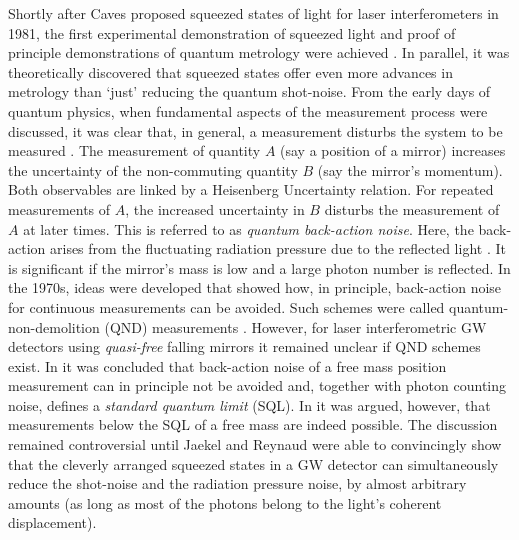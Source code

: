 Shortly after Caves proposed squeezed states of light for laser
interferometers in 1981, the first experimental demonstration of squeezed
light \cite{Slusher1985} and proof of principle demonstrations of
quantum metrology were achieved \cite{Xiao1987,Grangier1987}. In parallel, it was theoretically discovered that squeezed states offer even more advances in metrology than `just' reducing the quantum shot-noise.
From the early days of quantum physics, when fundamental
aspects of the measurement process were discussed, it was clear that,
in general, a measurement disturbs the system to be measured
\cite{Braginsky1999}. %
 The measurement of quantity $A$ (say
a position of a mirror) increases the uncertainty of the
non-commuting quantity $B$ (say the mirror's momentum). Both
observables are linked by a Heisenberg Uncertainty relation. For
repeated measurements of $A$, the increased uncertainty in $B$
disturbs the measurement of $A$ at later times. This is referred to
as \textit{quantum back-action noise}. Here, the back-action arises
from the fluctuating radiation pressure due to the reflected light \cite{CavesPRL451980}.
It is significant if the mirror's mass is low and a
large photon number is reflected. In the 1970s, ideas were developed
that showed how, in principle, back-action noise for continuous
measurements can be avoided. Such schemes were called
quantum-non-demolition (QND) measurements \cite{Thorne1978, BraginskyRMP1996}.
However, for laser interferometric GW detectors
using \textit{quasi-free} falling mirrors it remained unclear if QND schemes
exist. In \cite{CavesPRL451980,Caves1981} it was concluded that back-action noise
of a free mass position measurement can in principle not be avoided and, together with photon counting noise, defines a \textsl{standard
quantum limit} (SQL). In \cite{Yuen1983,Unruh1983} it was argued, however, that measurements below the
SQL of a free mass are indeed possible. The discussion
remained controversial \cite{CavesPRL1985} until Jaekel and Reynaud
\cite{Jaekel1990} were able to convincingly show that the cleverly
arranged squeezed states in a GW detector can simultaneously reduce
the shot-noise and the radiation pressure noise, by almost arbitrary
amounts (as long as most of the photons belong to the light's coherent displacement).

